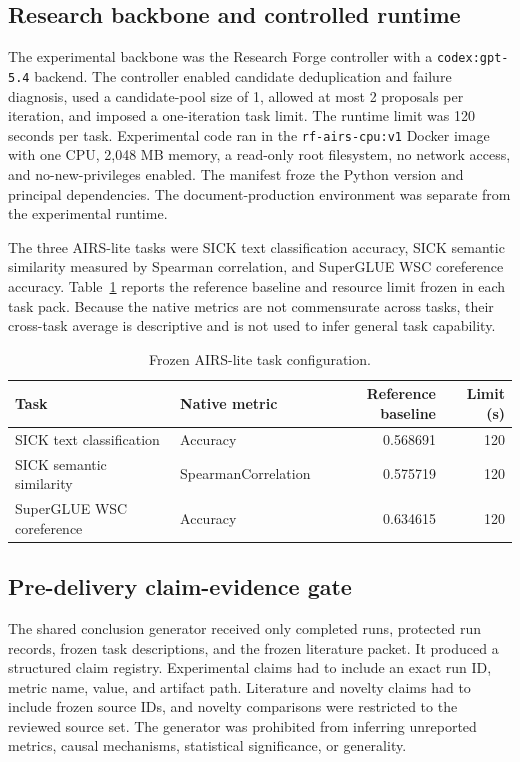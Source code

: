 \documentclass[11pt]{article}
\begin{document}
\subsection{Research backbone and controlled runtime}

The experimental backbone was the Research Forge controller with a \texttt{codex:gpt-5.4} backend. The controller enabled candidate deduplication and failure diagnosis, used a candidate-pool size of 1, allowed at most 2 proposals per iteration, and imposed a one-iteration task limit. The runtime limit was 120 seconds per task. Experimental code ran in the \texttt{rf-airs-cpu:v1} Docker image with one CPU, 2,048 MB memory, a read-only root filesystem, no network access, and no-new-privileges enabled. The manifest froze the Python version and principal dependencies. The document-production environment was separate from the experimental runtime.

The three AIRS-lite tasks were SICK text classification accuracy, SICK semantic similarity measured by Spearman correlation, and SuperGLUE WSC coreference accuracy. Table~\ref{tab:tasks} reports the reference baseline and resource limit frozen in each task pack. Because the native metrics are not commensurate across tasks, their cross-task average is descriptive and is not used to infer general task capability.

\begin{table}[H]
\centering
\caption{Frozen AIRS-lite task configuration.}
\label{tab:tasks}
\begin{tabularx}{\textwidth}{>{\raggedright\arraybackslash}X l r r}
\toprule
Task & Native metric & Reference baseline & Limit (s) \\
\midrule
SICK text classification & Accuracy & 0.568691 & 120 \\
SICK semantic similarity & SpearmanCorrelation & 0.575719 & 120 \\
SuperGLUE WSC coreference & Accuracy & 0.634615 & 120 \\
\bottomrule
\end{tabularx}
\end{table}

\subsection{Pre-delivery claim-evidence gate}

The shared conclusion generator received only completed runs, protected run records, frozen task descriptions, and the frozen literature packet. It produced a structured claim registry. Experimental claims had to include an exact run ID, metric name, value, and artifact path. Literature and novelty claims had to include frozen source IDs, and novelty comparisons were restricted to the reviewed source set. The generator was prohibited from inferring unreported metrics, causal mechanisms, statistical significance, or generality.
\end{document}
